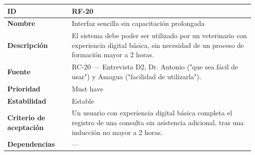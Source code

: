 {\def\LTcaptype{none} %
\begin{longtable}[]{@{}
  >{\raggedright\arraybackslash}p{}
  >{\raggedright\arraybackslash}p{}@{}}
\toprule\noalign{}
\begin{minipage}[b]{\linewidth}\raggedright
\textbf{ID}
\end{minipage} & \begin{minipage}[b]{\linewidth}\raggedright
RF-20
\end{minipage} \\
\midrule\noalign{}
\endhead
\bottomrule\noalign{}
\endlastfoot
\textbf{Nombre} & \begin{minipage}[t]{\linewidth}\raggedright
Interfaz sencilla sin capacitación prolongada
\end{minipage} \\
\textbf{Descripción} & \begin{minipage}[t]{\linewidth}\raggedright
El sistema debe poder ser utilizado por un veterinario con experiencia
digital básica, sin necesidad de un proceso de formación mayor a 2
horas.
\end{minipage} \\
\textbf{Fuente} & \begin{minipage}[t]{\linewidth}\raggedright
RC-20 --- Entrevista D2, Dr. Antonio ("que sea fácil de usar") y Amagua
("facilidad de utilizarla").
\end{minipage} \\
\textbf{Prioridad} & \begin{minipage}[t]{\linewidth}\raggedright
Must have
\end{minipage} \\
\textbf{Estabilidad} & \begin{minipage}[t]{\linewidth}\raggedright
Estable
\end{minipage} \\
\textbf{Criterio de aceptación} &
\begin{minipage}[t]{\linewidth}\raggedright
Un usuario con experiencia digital básica completa el registro de una
consulta sin asistencia adicional, tras una inducción no mayor a 2
horas.
\end{minipage} \\
\textbf{Dependencias} & \begin{minipage}[t]{\linewidth}\raggedright
---
\end{minipage} \\
\end{longtable}
}

